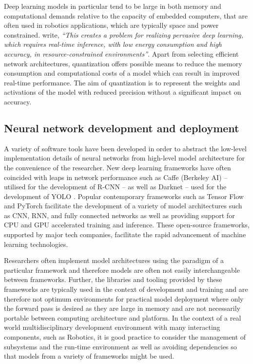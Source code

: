 \documentclass[a4paper,twoside,12pt]{report}
\begin{document}
Deep learning models in particular tend to be large in both memory and computational demands relative to the capacity of embedded computers, that are often used in robotics applications, which are typically space and power constrained. \cite{quantization} write, \textit{``This creates a problem for realizing pervasive deep learning, which requires real-time inference, with low energy consumption and high accuracy, in resource-constrained environments''}. Apart from selecting efficient network architectures, quantization offers possible means to reduce the memory consumption and computational costs of a model which can result in improved real-time performance. The aim of quantization is to represent the weights and activations of the model with reduced precision without a significant impact on accuracy. 

\subsection{Neural network development and deployment}

A variety of software tools have been developed in order to abstract the low-level implementation details of neural networks from high-level model architecture for the convenience of the researcher. New deep learning frameworks have often coincided with leaps in network performance such as Caffe (Berkeley AI) \citep{caffe} -- utilised for the development of R-CNN \citep{rcnn} -- as well as Darknet -- used for the development of YOLO \citep{yolo}. Popular contemporary frameworks such as Tensor Flow \citep{tensorflow} and PyTorch \citep{pytorch} facilitate the development of a variety of model architectures such as CNN, RNN, and fully connected networks as well as providing support for CPU and GPU accelerated training and inference. These open-source frameworks, supported by major tech companies, facilitate the rapid advancement of machine learning technologies.

Researchers often implement model architectures using the paradigm of a particular framework and therefore models are often not easily interchangeable between frameworks. Further, the libraries and tooling provided by these frameworks are typically used in the context of development and training and are therefore not optimum environments for practical model deployment where only the forward pass is desired as they are large in memory and are not necessarily portable between computing architecture and platform. In the context of a real world multidisciplinary development environment with many interacting components, such as Robotics, it is good practice to consider the management of subsystems and the run-time environment as well as avoiding dependencies so that models from a variety of frameworks might be used. 
\end{document}
